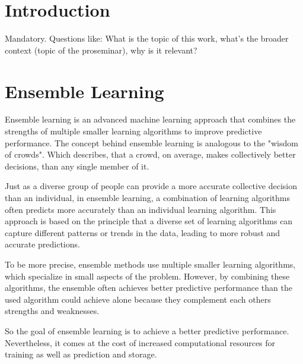 \section{Introduction}
Mandatory. Questions like: What is the topic of this work, what's the broader context (topic of the proseminar), why is it relevant?

\section{Ensemble Learning}

Ensemble learning is an advanced machine learning approach that combines the 
strengths of multiple smaller learning algorithms to improve predictive 
performance. 
The concept behind ensemble learning is analogous to the "wisdom of crowds".
Which describes, that a crowd, on average, makes collectively better decisions,
than any single member of it.

Just as a diverse group of people can provide a more accurate collective decision 
than an individual, in ensemble learning, a combination of learning algorithms
often predicts more accurately than an individual learning algorithm.
This approach is based on the principle that a diverse set of learning algorithms
can capture different patterns or trends in the data, leading to more robust and 
accurate predictions.

To be more precise, ensemble methods use multiple smaller learning algorithms,
which specialize in small aspects of the problem. However, by combining these
algorithms, the ensemble often achieves better predictive performance than 
the used algorithm could achieve alone because they complement each others
strengths and weaknesses.

So the goal of ensemble learning is to achieve a better predictive performance.
Nevertheless, it comes at the cost of increased computational resources for 
training as well as prediction and storage.

